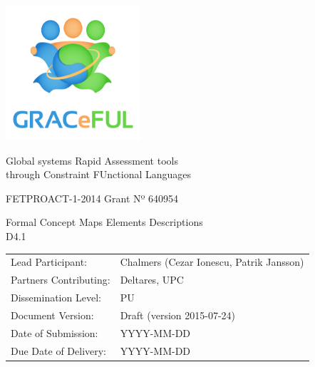\documentclass{article}
\begin{document}
\begin{center}
\includegraphics[width=5cm]{GRACeFULlogo.png}

\textcolor{GRACeFULblue}{Global systems Rapid Assessment tools\\
through Constraint FUnctional Languages}

\vspace{1cm}

FETPROACT-1-2014 Grant Nº 640954

\end{center}

\begin{framed}
\begin{center}
\Large
Formal Concept Maps Elements Descriptions\\[1ex]

D4.1\\[1ex]

\end{center}
\end{framed}

\vspace{1cm}

\noindent
\begin{tabular}{@{}ll@{}}
  Lead Participant:       & Chalmers (Cezar Ionescu, Patrik Jansson)
\\Partners Contributing:  & Deltares, UPC
\\Dissemination Level:    & PU
\\Document Version:       & Draft (version 2015-07-24)
\\Date of Submission:     & YYYY-MM-DD
\\Due Date of Delivery:   & YYYY-MM-DD
\end{tabular}
\end{document}
